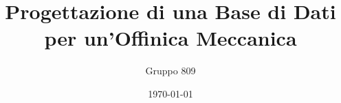 \documentclass[12pt,twoside]{article}
\begin{document}
\title{Progettazione di una Base di Dati per un'Offinica Meccanica}
\author{Gruppo 809}
\date{\today{}}
\maketitle





\end{document}
